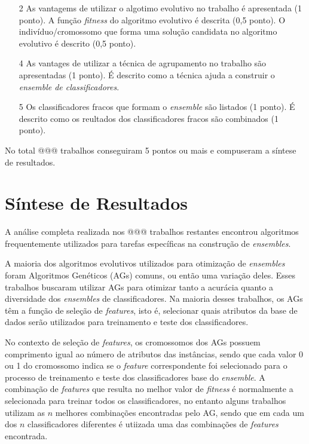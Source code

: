 \documentclass[12pt]{report}
\begin{document}
\begin{enumerate}
  \item[2] As vantagems de utilizar o algotimo evolutivo no trabalho é apresentada (1 ponto). A função \textit{fitness} do algoritmo evolutivo é descrita (0,5 ponto). O indivíduo/cromossomo que forma uma solução candidata no algoritmo evolutivo é descrito (0,5 ponto).
  \item[4] As vantages de utilizar a técnica de agrupamento no trabalho são apresentadas (1 ponto). É descrito como a técnica ajuda a construir o \textit{ensemble de classificadores}.
  \item[5] Os classificadores fracos que formam o \textit{ensemble} são listados (1 ponto). É descrito como os reultados dos classificadores fracos são combinados (1 ponto).
\end{enumerate}

No total @@@ trabalhos conseguiram 5 pontos ou mais e compuseram a síntese de resultados.

\section{Síntese de Resultados} \label{sec:sintese_de_resultados}

A análise completa realizada nos @@@ trabalhos restantes encontrou algoritmos frequentemente utilizados para tarefas específicas na construção de \textit{ensembles}.

A maioria dos algoritmos evolutivos utilizados para otimização de \textit{ensembles} foram Algoritmos Genéticos (AGs) comuns, ou então uma variação deles. Esses trabalhos buscaram utilizar AGs para otimizar tanto a acurácia quanto a diversidade dos \textit{ensembles} de classificadores. Na maioria desses trabalhos, os AGs têm a função de seleção de \textit{features}, isto é, selecionar quais atributos da base de dados serão utilizados para treinamento e teste dos classificadores.

No contexto de seleção de \textit{features}, os cromossomos dos AGs possuem comprimento igual ao número de atributos das instâncias, sendo que cada valor 0 ou 1 do cromossomo indica se o \textit{feature} correspondente foi selecionado para o processo de treinamento e teste dos classificadores base do \textit{ensemble}. A combinação de \textit{features} que resulta no melhor valor de \textit{fitness} é normalmente a selecionada para treinar todos os classificadores, no entanto alguns trabalhos utilizam as $n$ melhores combinações encontradas pelo AG, sendo que em cada um dos $n$ classificadores diferentes é utiizada uma das combinações de \textit{features} encontrada.
\end{document}
